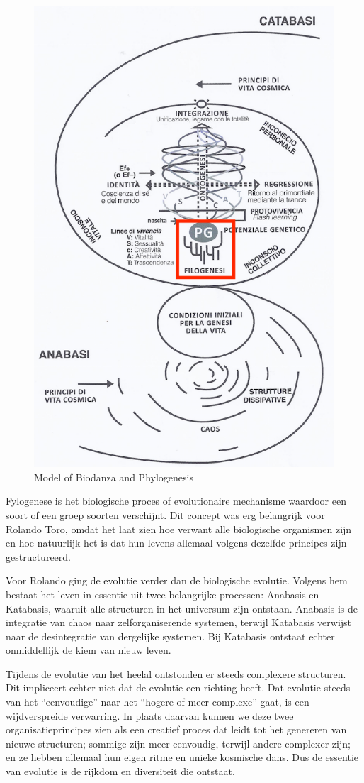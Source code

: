 \documentclass[
  11pt,
]{book}
\begin{document}
\begin{figure}

{\centering \includegraphics[width=0.5\linewidth]{./figs/biologischeAspectenBiodanzaDeelII} 

}

\caption{Model of Biodanza and Phylogenesis}\label{fig:modelPhylo}
\end{figure}

Fylogenese is het biologische proces of evolutionaire mechanisme waardoor een soort of een groep soorten verschijnt. Dit concept was erg belangrijk voor Rolando Toro, omdat het laat zien hoe verwant alle biologische organismen zijn en hoe natuurlijk het is dat hun levens allemaal volgens dezelfde principes zijn gestructureerd.

Voor Rolando ging de evolutie verder dan de biologische evolutie. Volgens hem bestaat het leven in essentie uit twee belangrijke processen: Anabasis en Katabasis, waaruit alle structuren in het universum zijn ontstaan. Anabasis is de integratie van chaos naar zelforganiserende systemen, terwijl Katabasis verwijst naar de desintegratie van dergelijke systemen. Bij Katabasis ontstaat echter onmiddellijk de kiem van nieuw leven.

Tijdens de evolutie van het heelal ontstonden er steeds complexere structuren. Dit impliceert echter niet dat de evolutie een richting heeft. Dat evolutie steeds van het ``eenvoudige'' naar het ``hogere of meer complexe'' gaat, is een wijdverspreide verwarring. In plaats daarvan kunnen we deze twee organisatieprincipes zien als een creatief proces dat leidt tot het genereren van nieuwe structuren; sommige zijn meer eenvoudig, terwijl andere complexer zijn; en ze hebben allemaal hun eigen ritme en unieke kosmische dans. Dus de essentie van evolutie is de rijkdom en diversiteit die ontstaat.
\end{document}
